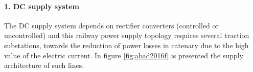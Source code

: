 \paragraph{1. DC supply system\\}

The DC supply system depends on rectifier converters (controlled or uncontrolled) and this railway power supply topology requires several traction substations, towards the reduction of power losses in catenary due to the high value of the electric current. In figure \ref{fig:abad2016f} is presented the supply architecture of such lines.

